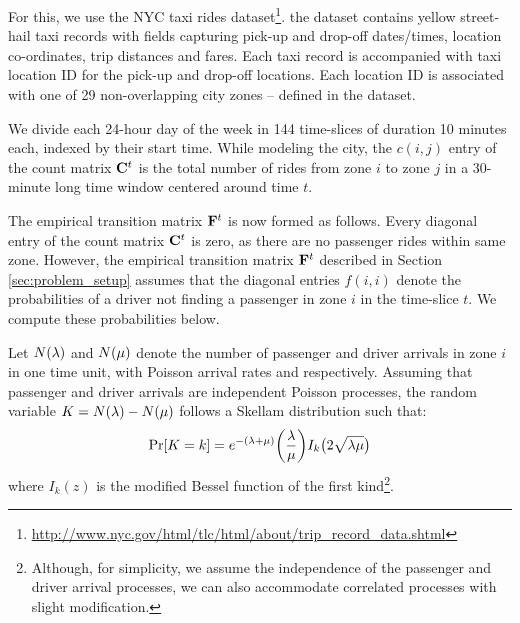 For this, we use the NYC taxi rides dataset\footnote{\url{http://www.nyc.gov/html/tlc/html/about/trip_record_data.shtml}}. 
the dataset contains yellow street-hail taxi records with fields capturing pick-up and drop-off dates/times, location co-ordinates, trip distances and fares. Each taxi record is accompanied with taxi location ID for the pick-up and drop-off locations. 
Each location ID is associated with one of 29 non-overlapping city zones -- defined in the
dataset.


We divide each 24-hour day of the week in 144 time-slices of duration 10 minutes each, indexed by their start time. While modeling the city, the $c(i,j)$ entry of the count matrix ${\mathbf{C}}^t$ is the total number of rides from zone $i$ to zone $j$ in a 30-minute long time window centered around time $t$. 

The empirical transition matrix ${\mathbf{F}}^t$ is now formed as follows.
 Every diagonal entry of the count matrix ${\mathbf{C}}^t$ is zero, as there are no passenger rides within same zone. However, the empirical transition matrix ${\mathbf{F}}^t$ described in Section \ref{sec:problem_setup} assumes that the diagonal entries $f(i,i)$ denote the probabilities of a driver not finding a passenger in zone $i$ in the time-slice $t$. We compute these probabilities below.

Let $N(\lambda)$ and $N(\mu)$ denote the number of passenger and driver arrivals in zone $i$ in one time unit, with Poisson arrival rates {\passengerarrivalrate} and {\driverarrivalrate} respectively. Assuming that passenger and driver arrivals are independent Poisson processes, the random variable $K = N(\lambda) - N(\mu)$ follows a Skellam distribution 
such that:
\begin{equation}
\Pr[K=k] = e^{-(\lambda + \mu)} \bigg(\frac{\lambda}{\mu}\bigg) I_k\big(2 \sqrt{\lambda \mu}\big)
\end{equation}
where $I_k(z)$ is the modified Bessel function of the first kind\footnote{Although, for simplicity, we assume the independence of the passenger and driver arrival processes, we can also accommodate correlated processes with slight modification.}.

